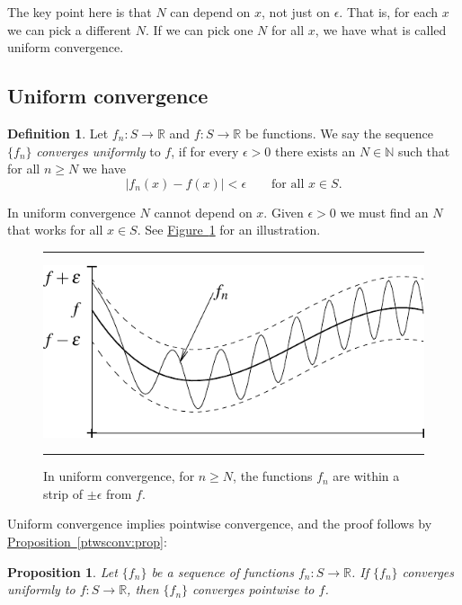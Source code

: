 \documentclass[12pt]{book}
\newenvironment{myfigureht}{%
\begin{figure}[h!t]
\noindent\rule{\textwidth}{0.4pt}\vspace{12pt}\par\centering}%
{\par\noindent\rule{\textwidth}{0.4pt}
\end{figure}}
\newcommand{\abs}[1]{\left\lvert {#1} \right\rvert}
\newcommand{\R}{{\mathbb{R}}}
\newcommand{\N}{{\mathbb{N}}}
\newcommand{\myindex}[1]{#1\index{#1}}
\theoremstyle{plain}
\newtheorem{prop}[thm]{Proposition}
\theoremstyle{remark}
\theoremstyle{definition}
\newtheorem{defn}[thm]{Definition}
\theoremstyle{exercise}
\theoremstyle{example}
\newcommand{\figureref}[1]{\hyperref[#1]{Figure~\ref*{#1}}}
\newcommand{\propref}[1]{\hyperref[#1]{Proposition~\ref*{#1}}}
\begin{document}
The key point here is that $N$ can depend on $x$, not just on
$\epsilon$.  That is, for each $x$ we can pick a different $N$.
If we can pick one $N$ for all $x$, we have what is called
uniform convergence.

\subsection{Uniform convergence}

\begin{defn}
Let $f_n \colon S \to \R$
and $f \colon S \to \R$
be functions.  We say the sequence $\{ f_n \}$
\emph{\myindex{converges uniformly}} to $f$, if for
every $\epsilon > 0$ there exists an $N \in \N$ such that 
for all $n \geq N$ we have
\begin{equation*}
\abs{f_n(x) - f(x)} < \epsilon \qquad \text{for all $x \in S$.}
\end{equation*}
\end{defn}

In uniform convergence $N$ cannot depend on $x$.  Given $\epsilon > 0$
we must find an $N$ that works for all $x \in S$.  See
\figureref{fig:uniformconv} for an illustration.
\begin{myfigureht}
\includegraphics{figures/uniformconv}
\caption{In uniform convergence,
for $n \geq N$,
the functions $f_n$ are within a strip of $\pm\epsilon$ from $f$.%
\label{fig:uniformconv}}
\end{myfigureht}

Uniform convergence
implies pointwise convergence, and the proof follows by
\propref{ptwsconv:prop}:

\begin{prop}
Let $\{ f_n \}$ be a sequence of functions $f_n \colon S \to \R$.
If $\{ f_n \}$ converges
uniformly to $f \colon S \to \R$, then $\{ f_n \}$ converges pointwise to $f$.
\end{prop}
\end{document}
